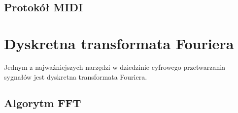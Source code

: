 \subsection{Protokół MIDI}




\section{Dyskretna transformata Fouriera}
Jednym z najważniejszych narzędzi w dziedzinie cyfrowego przetwarzania sygnałów jest dyskretna transformata Fouriera. 
\subsection{Algorytm FFT}
